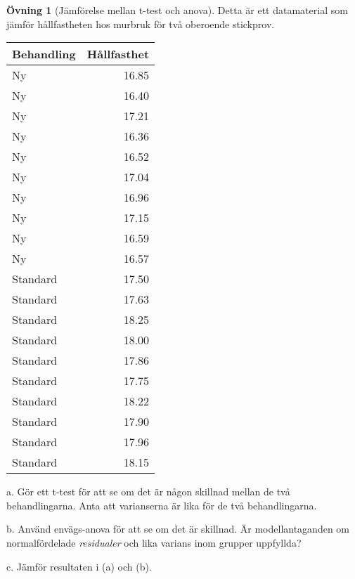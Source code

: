 \documentclass[
]{book}
\theoremstyle{definition}
\theoremstyle{definition}
\theoremstyle{definition}
\newtheorem{exercise}{Övning}[chapter]
\theoremstyle{definition}
\theoremstyle{remark}
\begin{document}
\begin{exercise}[Jämförelse mellan t-test och anova]
Detta är ett datamaterial som jämför hållfastheten hos murbruk för två oberoende stickprov.

\begin{table}
\centering
\begin{tabular}[t]{lr}
\toprule
Behandling & Hållfasthet\\
\midrule
Ny & 16.85\\
Ny & 16.40\\
Ny & 17.21\\
Ny & 16.36\\
Ny & 16.52\\
\addlinespace
Ny & 17.04\\
Ny & 16.96\\
Ny & 17.15\\
Ny & 16.59\\
Ny & 16.57\\
\addlinespace
Standard & 17.50\\
Standard & 17.63\\
Standard & 18.25\\
Standard & 18.00\\
Standard & 17.86\\
\addlinespace
Standard & 17.75\\
Standard & 18.22\\
Standard & 17.90\\
Standard & 17.96\\
Standard & 18.15\\
\bottomrule
\end{tabular}
\end{table}

a. Gör ett t-test för att se om det är någon skillnad mellan de två behandlingarna. Anta att varianserna är lika för de två behandlingarna.

b. Använd envägs-anova för att se om det är skillnad. Är modellantaganden om normalfördelade \emph{residualer} och lika varians inom grupper uppfyllda?

c. Jämför resultaten i (a) och (b).
\end{exercise}
\end{document}

